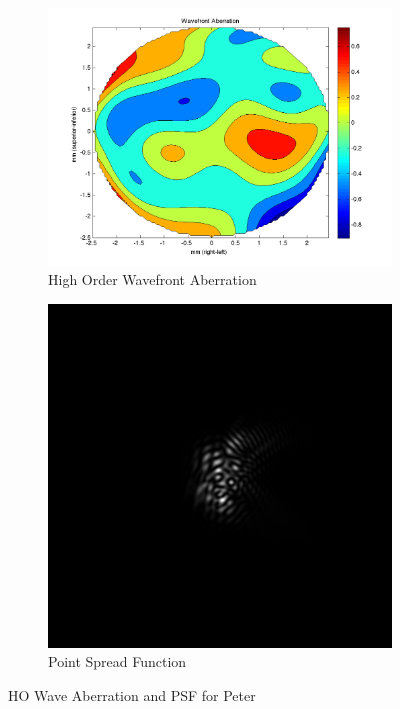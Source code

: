 \documentclass{article}
\begin{document}
\begin{figure}[H]
\begin{subfigure}{.5\textwidth}
  \centering
  \includegraphics[width=1\linewidth]{Peter_WFA.png}
  \caption{High Order Wavefront Aberration}
  \label{fig:peterhowa}
\end{subfigure}%
\begin{subfigure}{.5\textwidth}
  \centering
  \includegraphics[width=.8\linewidth]{Peter_PSF.png}
  \caption{Point Spread Function}
  \label{fig:peterpsf}
\end{subfigure}
\caption{HO Wave Aberration and PSF for Peter}
\label{fig:peter}
\end{figure}
\end{document}

